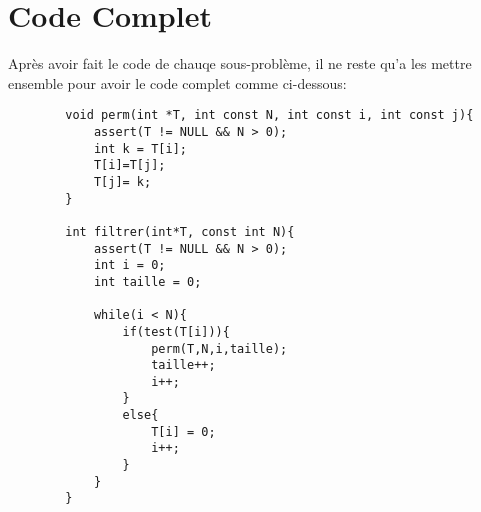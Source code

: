 \documentclass[a4paper, 11pt, oneside]{article}
\begin{document}
\section{Code Complet}
    Après avoir fait le code de chauqe sous-problème, il ne reste qu'a les mettre ensemble pour avoir le code complet 
    comme ci-dessous:
    \begin{lstlisting}
        void perm(int *T, int const N, int const i, int const j){
            assert(T != NULL && N > 0);
            int k = T[i];
            T[i]=T[j];
            T[j]= k;
        }

        int filtrer(int*T, const int N){
            assert(T != NULL && N > 0);
            int i = 0;
            int taille = 0;

            while(i < N){
                if(test(T[i])){
                    perm(T,N,i,taille);
                    taille++;
                    i++;
                }
                else{
                    T[i] = 0;
                    i++;
                }
            }
        }    
        \end{lstlisting}
\end{document}
